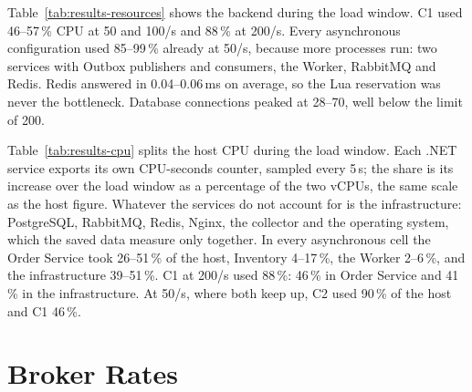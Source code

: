 \documentclass[a4paper]{report}
\begin{document}
Table~\ref{tab:results-resources} shows the backend during the load window.
C1 used 46--57\,\% CPU at 50 and 100/s and 88\,\% at 200/s. Every
asynchronous configuration used 85--99\,\% already at 50/s, because more
processes run: two services with Outbox publishers and consumers, the Worker,
RabbitMQ and Redis. Redis answered in 0.04--0.06\,ms on average, so the Lua
reservation was never the bottleneck. Database connections peaked at 28--70,
well below the limit of 200.

Table~\ref{tab:results-cpu} splits the host CPU during the load window. Each
.NET service exports its own CPU-seconds counter, sampled every 5\,s; the
share is its increase over the load window as a percentage of the two vCPUs,
the same scale as the host figure. Whatever the services do not account for
is the infrastructure: PostgreSQL, RabbitMQ, Redis, Nginx, the collector and
the operating system, which the saved data measure only together. In every
asynchronous cell the Order Service took 26--51\,\% of the host, Inventory
4--17\,\%, the Worker 2--6\,\%, and the infrastructure 39--51\,\%. C1 at
200/s used 88\,\%: 46\,\% in Order Service and 41\,\% in the
infrastructure. At 50/s, where both keep up, C2 used 90\,\% of the host and
C1 46\,\%.

\begin{table}[tbp]
\centering
\footnotesize
{}
\caption{Where the CPU goes during the 60\,s load, as \% of the 2-vCPU host.
Order Svc., Inventory (summed over its replicas) and Worker come from each
process's own CPU-seconds counter; Infrastructure is the host CPU minus those
three (PostgreSQL, RabbitMQ, Redis, Nginx, the collector and the OS). In C1
the Inventory Service and the Worker run but take no part, so they show 0.
Cells: median of 3 runs (range).}
\label{tab:results-cpu}
\end{table}

\begin{table}[tbp]
\centering
\footnotesize
{}
\caption{Backend host during each run. CPU in load is the mean host CPU over
the 60\,s load window; peak is the highest sample of the run. RAM is the peak
host memory in use. DB conns is the peak number of PostgreSQL connections.
Redis is the mean time per Redis command. Cells: median of 3 runs (range).}
\label{tab:results-resources}
\end{table}

\section{Broker Rates}
\label{sec:results-broker}
\end{document}
